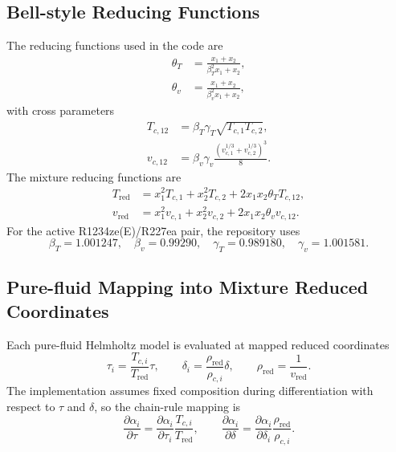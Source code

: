 \documentclass[11pt]{article}
\begin{document}
\subsection{Bell-style Reducing Functions}
The reducing functions used in the code are
\begin{align}
\theta_T &= \frac{x_1+x_2}{\beta_T^2 x_1 + x_2}, \\
\theta_v &= \frac{x_1+x_2}{\beta_v^2 x_1 + x_2},
\end{align}
with cross parameters
\begin{align}
T_{c,12} &= \beta_T \gamma_T \sqrt{T_{c,1} T_{c,2}}, \\
v_{c,12} &= \beta_v \gamma_v
\frac{\left(v_{c,1}^{1/3}+v_{c,2}^{1/3}\right)^3}{8}.
\end{align}
The mixture reducing functions are
\begin{align}
T_{\mathrm{red}}
&= x_1^2 T_{c,1} + x_2^2 T_{c,2}
+ 2 x_1 x_2 \theta_T T_{c,12}, \\
v_{\mathrm{red}}
&= x_1^2 v_{c,1} + x_2^2 v_{c,2}
+ 2 x_1 x_2 \theta_v v_{c,12}.
\end{align}
For the active R1234ze(E)/R227ea pair, the repository uses
\begin{equation}
\beta_T = 1.001247,\quad
\beta_v = 0.99290,\quad
\gamma_T = 0.989180,\quad
\gamma_v = 1.001581.
\end{equation}

\subsection{Pure-fluid Mapping into Mixture Reduced Coordinates}
Each pure-fluid Helmholtz model is evaluated at mapped reduced coordinates
\begin{equation}
\tau_i = \frac{T_{c,i}}{T_{\mathrm{red}}}\tau,
\qquad
\delta_i = \frac{\rho_{\mathrm{red}}}{\rho_{c,i}} \delta,
\qquad
\rho_{\mathrm{red}} = \frac{1}{v_{\mathrm{red}}}.
\end{equation}
The implementation assumes fixed composition during differentiation with respect to $\tau$ and $\delta$, so the chain-rule mapping is
\begin{equation}
\frac{\partial \alpha_i}{\partial \tau}
=
\frac{\partial \alpha_i}{\partial \tau_i}
\frac{T_{c,i}}{T_{\mathrm{red}}},
\qquad
\frac{\partial \alpha_i}{\partial \delta}
=
\frac{\partial \alpha_i}{\partial \delta_i}
\frac{\rho_{\mathrm{red}}}{\rho_{c,i}}.
\end{equation}
\end{document}
